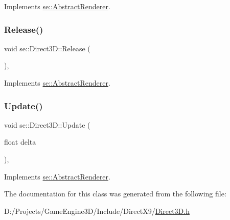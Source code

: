 Implements \mbox{\hyperlink{classse_1_1_abstract_renderer_a302d3f6e465ad7df40c317068a5420fc}{se\+::\+Abstract\+Renderer}}.

\mbox{\label{classse_1_1_direct3_d_ae2979f16a5c35773cf2c243d8e6f90e4}} 
\subsubsection{\texorpdfstring{Release()}{Release()}}
{\footnotesize\ttfamily void se\+::\+Direct3\+D\+::\+Release (\begin{DoxyParamCaption}{ }\end{DoxyParamCaption})\hspace{0.3cm}{\ttfamily [override]}, {\ttfamily [virtual]}}



Implements \mbox{\hyperlink{classse_1_1_abstract_renderer_a98e35b7db62827580573185ed91b25bb}{se\+::\+Abstract\+Renderer}}.

\mbox{\label{classse_1_1_direct3_d_a39934c194406f108a992d82a4d265381}} 
\subsubsection{\texorpdfstring{Update()}{Update()}}
{\footnotesize\ttfamily void se\+::\+Direct3\+D\+::\+Update (\begin{DoxyParamCaption}\item[{float}]{delta }\end{DoxyParamCaption})\hspace{0.3cm}{\ttfamily [override]}, {\ttfamily [virtual]}}



Implements \mbox{\hyperlink{classse_1_1_abstract_renderer_aae49e7417663d6a5aca34a2bb37b4b28}{se\+::\+Abstract\+Renderer}}.



The documentation for this class was generated from the following file\+:\begin{DoxyCompactItemize}
\item 
D\+:/\+Projects/\+Game\+Engine3\+D/\+Include/\+Direct\+X9/\mbox{\hyperlink{_direct3_d_8h}{Direct3\+D.\+h}}\end{DoxyCompactItemize}
